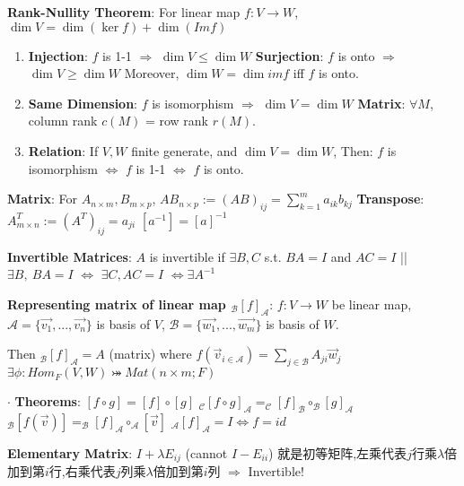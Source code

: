 \documentclass[9pt]{article}
\begin{document}
\textbf{Rank-Nullity Theorem}: For linear map $f:V\to W$, $\dim V=\dim(\ker f)+\dim(Im f)$ \quad \quad {}

\begin{enumerate}[itemsep=-2pt, topsep=-2pt]
    \item \textbf{Injection}: $f$ is 1-1 $\Rightarrow$ $\dim V \leq \dim W$ \quad \textbf{Surjection}: $f$ is onto $\Rightarrow$ $\dim V \geq \dim W$ \quad Moreover, $\dim W=\dim imf$ iff $f$ is onto.
    \item \textbf{Same Dimension}: {\small $f$ is isomorphism $\Rightarrow$ $\dim V=\dim W$} \quad \quad \quad \textbf{Matrix}: $\forall M$, column rank $c(M)$ = row rank $r(M)$.
    \item \textbf{Relation}: {\small If $V,W$ finite generate, and $\dim V=\dim W$, \quad Then: $f$ is isomorphism $\Leftrightarrow$ $f$ is 1-1 $\Leftrightarrow$ $f$ is onto.}
\end{enumerate}

\textbf{Matrix}: For $A_{n\times m},B_{m\times p}$, $AB_{n\times p}:=(AB)_{ij}=\sum_{k=1}^{m}a_{ik}b_{kj}$ \quad \textbf{Transpose}: $A^T_{m\times n}:=(A^T)_{ij}=a_{ji}$ \quad \quad \quad $[a^{-1}]=[a]^{-1}$

\textbf{Invertible Matrices}: $A$ is invertible if $\exists B,C$ s.t. $BA=I$ and $AC=I$ \quad || \quad $\exists B, \ BA=I$ $\Leftrightarrow$ $\exists C,AC=I$ $\Leftrightarrow \exists A^{-1}$

\textbf{Representing matrix of linear map $_{\mathcal{B}}[f]_{\mathcal{A}}$}: $f:V\to W$ be linear map, $\mathcal{A}=\{\vec{v_1},...,\vec{v_n}\}$ is basis of $V$, $\mathcal{B}=\{\vec{w_1},...,\vec{w_m}\}$ is basis of $W$.

\quad Then $_{\mathcal{B}}[f]_{\mathcal{A}}=A$ {\small (matrix)} where $f(\vec{v}_{i\in\mathcal{A}})=\sum_{j\in\mathcal{B}}A_{ji}\vec{w}_j$ \quad \quad $\exists \phi:Hom_{F}(V,W)\bij Mat(n\times m;F)$

$\cdot$ \textbf{Theorems}: $[f\circ g]=[f]\circ[g]$ \quad \quad $_{\mathcal{C}}[f\circ g]_{\mathcal{A}}=_{\mathcal{C}}[f]_{\mathcal{B}}\circ_{\mathcal{B}}[g]_{\mathcal{A}}$ \quad \quad $_{\mathcal{B}}[f(\vec{v})]=_{\mathcal{B}}[f]_{\mathcal{A}}\circ_{\mathcal{A}}[\vec{v}]$ \quad \quad $_{\mathcal{A}}[f]_{\mathcal{A}}=I\Leftrightarrow f=id$

\textbf{Elementary Matrix}: $I+\lambda E_{ij}$ {\scriptsize (cannot $I-E_{ii}$)} {\footnotesize 就是初等矩阵,左乘代表$j$行乘$\lambda$倍加到第$i$行,右乘代表$j$列乘$\lambda$倍加到第$i$列} \quad $\Rightarrow$ \quad Invertible!
\end{document}
